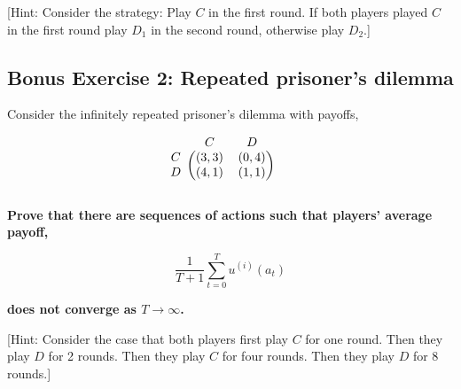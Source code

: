 \documentclass[10pt]{article}
\begin{document}
[Hint: Consider the strategy: Play \(C\) in the first round. If both players
played \(C\) in the first round play \(D_1\) in the second round, otherwise play
\(D_2\).]

\subsection*{Bonus Exercise 2: Repeated prisoner's dilemma}

Consider the infinitely repeated prisoner's dilemma with payoffs,

\begin{equation*}
    \begin{blockarray}{ccc}
        & C & D \\
        \begin{block}{c(cc)}
            C & (3, 3) & (0, 4) \\
            D & (4, 1) & (1, 1) \\
        \end{block}
    \end{blockarray}\qquad
\end{equation*}


\textbf{Prove that there are sequences of actions such that players' average payoff,}

\[\frac{1}{T+1} \sum\limits_{t=0}^{T} u^{(i)}(a_t)\]

\textbf{does not converge as \(T \rightarrow \infty\).}

[Hint: Consider the case that both players first play \(C\) for one round. Then they
play \(D\) for 2 rounds. Then they play \(C\) for four rounds. Then they play
\(D\) for 8 rounds.]
\end{document}
